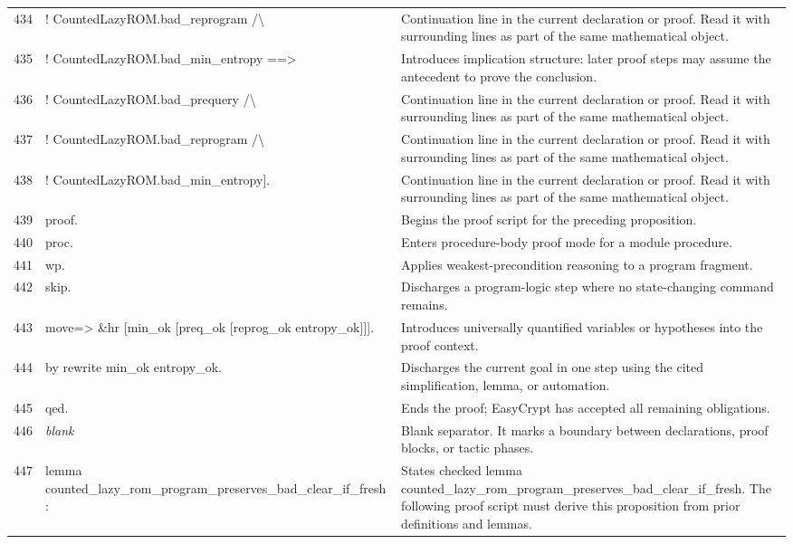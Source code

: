 \documentclass[10pt]{article}
\begin{document}
\begin{longtable}{r L{0.53\textwidth} L{0.37\textwidth}}
434 & {\ttfamily\scriptsize     ! CountedLazyROM.bad\_reprogram /\textbackslash{}} & Continuation line in the current declaration or proof.  Read it with surrounding lines as part of the same mathematical object. \\
435 & {\ttfamily\scriptsize     ! CountedLazyROM.bad\_min\_entropy ==>} & Introduces implication structure: later proof steps may assume the antecedent to prove the conclusion. \\
436 & {\ttfamily\scriptsize     ! CountedLazyROM.bad\_prequery /\textbackslash{}} & Continuation line in the current declaration or proof.  Read it with surrounding lines as part of the same mathematical object. \\
437 & {\ttfamily\scriptsize     ! CountedLazyROM.bad\_reprogram /\textbackslash{}} & Continuation line in the current declaration or proof.  Read it with surrounding lines as part of the same mathematical object. \\
438 & {\ttfamily\scriptsize     ! CountedLazyROM.bad\_min\_entropy].} & Continuation line in the current declaration or proof.  Read it with surrounding lines as part of the same mathematical object. \\
439 & {\ttfamily\scriptsize proof.} & Begins the proof script for the preceding proposition. \\
440 & {\ttfamily\scriptsize proc.} & Enters procedure-body proof mode for a module procedure. \\
441 & {\ttfamily\scriptsize wp.} & Applies weakest-precondition reasoning to a program fragment. \\
442 & {\ttfamily\scriptsize skip.} & Discharges a program-logic step where no state-changing command remains. \\
443 & {\ttfamily\scriptsize move=> \&hr [min\_ok [preq\_ok [reprog\_ok entropy\_ok]]].} & Introduces universally quantified variables or hypotheses into the proof context. \\
444 & {\ttfamily\scriptsize by rewrite min\_ok entropy\_ok.} & Discharges the current goal in one step using the cited simplification, lemma, or automation. \\
445 & {\ttfamily\scriptsize qed.} & Ends the proof; EasyCrypt has accepted all remaining obligations. \\
446 & {\ttfamily\scriptsize \emph{blank}} & Blank separator.  It marks a boundary between declarations, proof blocks, or tactic phases. \\
447 & {\ttfamily\scriptsize lemma counted\_lazy\_rom\_program\_preserves\_bad\_clear\_if\_fresh :} & States checked lemma counted\_lazy\_rom\_program\_preserves\_bad\_clear\_if\_fresh.  The following proof script must derive this proposition from prior definitions and lemmas. \\

\end{longtable}
\end{document}
